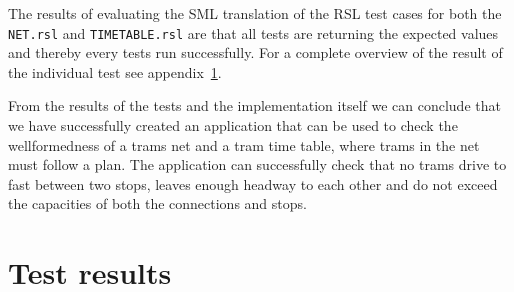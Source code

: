 \documentclass[a4]{article}
\begin{document}
The results of evaluating the SML translation of the RSL test cases for both the \verb=NET.rsl= and \verb=TIMETABLE.rsl= are that all tests are returning the expected values and thereby every tests run successfully. For a complete overview of the result of the individual test see appendix~\ref{app:results}.

From the results of the tests and the implementation itself we can conclude that we have successfully created an application that can be used to check the wellformedness of a trams net and a tram time table, where trams in the net must follow a plan. The application can successfully check that no trams drive to fast between two stops, leaves enough headway to each other and do not exceed the capacities of both the connections and stops.


\appendix
\section{Test results} \label{app:results}
\end{document}
